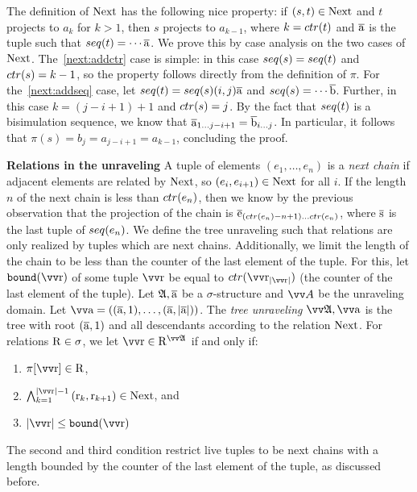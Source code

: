 The definition of $\mathrm{Next}$ has the following nice property: if $(s,t) \in \mathrm{Next}$ and $t$ projects to $a_{k}$ for $k > 1$, then $s$ projects to $a_{k-1}$, where $k = \ctr{t}$ and $\overline{\mathrm{a}}$ is the tuple such that $\seq{t} = \cdots \elemtuplea$.
We prove this by case analysis on the two cases of $\mathrm{Next}$.
The~\ref{next:addctr} case is simple: in this case $\seq{s} = \seq{t}$ and $\ctr{s} = k - 1$, so the property follows directly from the definition of $\pi$.
For the~\ref{next:addseq} case, let $\seq{t} = \seq{s} (i,j) \elemtuplea$ and $\seq{s} = \cdots \elemtupleb$.
Further, in this case $k = (j - i + 1) + 1$ and $\ctr{s} = j$.
By the fact that $\seq{t}$ is a bisimulation sequence, we know that $\overline{\mathrm{a}}_{1\ldots j-i+1} = \overline{\mathrm{b}}_{i\ldots j}$.
In particular, it follows that $\pi(s) = b_{j} = a_{j-i+1} = a_{k-1}$, concluding the proof.

\noindent
\textbf{Relations in the unraveling}
A tuple of elements $(e_{1}, \ldots, e_{n})$ is a \emph{next chain} if adjacent elements are related by $\mathrm{Next}$, so $(e_{i}, e_{i+1}) \in \mathrm{Next}$ for all $i$.
If the length $n$ of the next chain is less than $\ctr{e_{n}}$, then we know by the previous observation that the projection of the chain is $\elemtuplee_{(\ctr{e_{n}}-n+1)\ldots{}\ctr{e_{n}}}$, where $\overline{\mathrm{s}}$ is the last tuple of $\seq{e_{n}}$.
We define the tree unraveling such that relations are only realized by tuples which are next chains.
Additionally, we limit the length of the chain to be less than the counter of the last element of the tuple.
For this, let $\mathtt{bound}(\elemtuptupler)$ of some tuple $\elemtuptupler$ be equal to $\ctr{\elemtuptupler_{|\elemtuptupler|}}$ (the counter of the last element of the tuple).
Let ${\mathfrak{A}}, \overline{\mathrm{a}}$ be a $\sigma$-structure and $\unraveldom{A}$ be the unraveling domain.
Let $\elemtuptuplea = ((\elemtuplea, 1), \ldots, (\elemtuplea, |\elemtuplea|))$.
The \emph{tree unraveling} $\unravel{A}, \elemtuptuplea$ is the tree with root $(\overline{\mathrm{a}}, 1)$ and all descendants according to the relation $\mathrm{Next}$.
For relations $\mathrm{R} \in \sigma$, we let $\elemtuptupler \in \relR^{\unravel{A}}$ if and only if:
\begin{enumerate}
  \item $\pi[\elemtuptupler] \in \relR^{}$,
  \item $\bigwedge_{k=1}^{|\elemtuptupler|-1}{(\elemr_{k},\elemr_{k+1}) \in \relNext}$, and
  \item $|\elemtuptupler| \le \mathtt{bound}(\elemtuptupler)$
\end{enumerate}
The second and third condition restrict live tuples to be next chains with a length bounded by the counter of the last element of the tuple, as discussed before.

